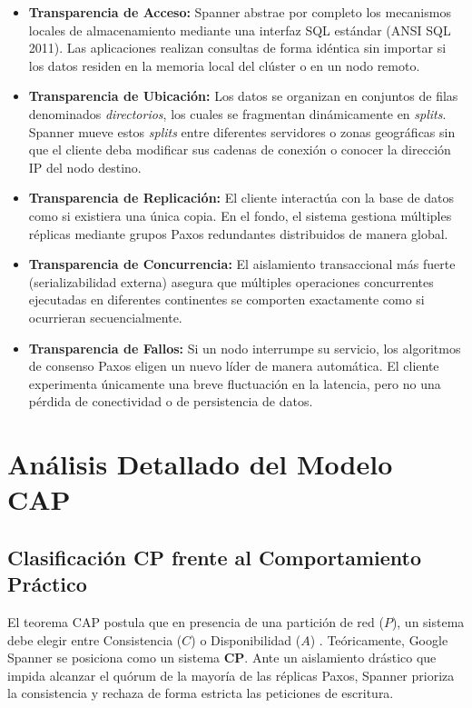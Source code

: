 \documentclass[11pt,a4paper]{article}
\begin{document}
\begin{itemize}
    \item \textbf{Transparencia de Acceso:} Spanner abstrae por completo los mecanismos locales de almacenamiento mediante una interfaz SQL estándar (ANSI SQL 2011). Las aplicaciones realizan consultas de forma idéntica sin importar si los datos residen en la memoria local del clúster o en un nodo remoto.
    \item \textbf{Transparencia de Ubicación:} Los datos se organizan en conjuntos de filas denominados \textit{directorios}, los cuales se fragmentan dinámicamente en \textit{splits}. Spanner mueve estos \textit{splits} entre diferentes servidores o zonas geográficas sin que el cliente deba modificar sus cadenas de conexión o conocer la dirección IP del nodo destino.
    \item \textbf{Transparencia de Replicación:} El cliente interactúa con la base de datos como si existiera una única copia. En el fondo, el sistema gestiona múltiples réplicas mediante grupos Paxos redundantes distribuidos de manera global.
    \item \textbf{Transparencia de Concurrencia:} El aislamiento transaccional más fuerte (serializabilidad externa) asegura que múltiples operaciones concurrentes ejecutadas en diferentes continentes se comporten exactamente como si ocurrieran secuencialmente.
    \item \textbf{Transparencia de Fallos:} Si un nodo interrumpe su servicio, los algoritmos de consenso Paxos eligen un nuevo líder de manera automática. El cliente experimenta únicamente una breve fluctuación en la latencia, pero no una pérdida de conectividad o de persistencia de datos.
\end{itemize}

\section{Análisis Detallado del Modelo CAP}
\subsection{Clasificación CP frente al Comportamiento Práctico}
El teorema CAP postula que en presencia de una partición de red ($P$), un sistema debe elegir entre Consistencia ($C$) o Disponibilidad ($A$) \cite{gilbert2002}. Teóricamente, Google Spanner se posiciona como un sistema \textbf{CP}. Ante un aislamiento drástico que impida alcanzar el quórum de la mayoría de las réplicas Paxos, Spanner prioriza la consistencia y rechaza de forma estricta las peticiones de escritura.
\end{document}
